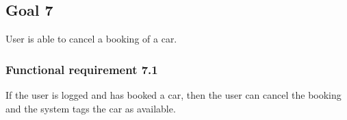 \subsection{Goal 7}
User is able to cancel a booking of a car.

\setcounter{secnumdepth}{3}
\subsubsection{Functional requirement 7.1}
If the user is logged and has booked a car, then the user can cancel the booking and the system tags the car as available.